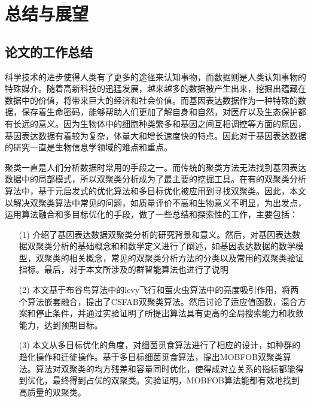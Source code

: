 \chapter{总结与展望}
\section{论文的工作总结}
科学技术的进步使得人类有了更多的途径来认知事物，而数据则是人类认知事物的特殊媒介。随着高新科技的迅猛发展，越来越多的数据被产生出来，挖掘出蕴藏在数据中的价值，将带来巨大的经济和社会价值。而基因表达数据作为一种特殊的数据，保存着生命密码，能够帮助人们更加了解自身和自然，对医疗以及生态保护都有长远的意义。因为生物体中的细胞种类繁多和基因之间互相调控等方面的原因，基因表达数据有着较为复杂，体量大和增长速度快的特点。因此对于基因表达数据的研究一直是生物信息学领域的难点和重点。

聚类一直是人们分析数据时常用的手段之一。而传统的聚类方法无法找到基因表达数据中的局部模式，所以双聚类分析成为了最主要的挖掘工具。在有的双聚类分析算法中，基于元启发式的优化算法和多目标优化被应用到寻找双聚类。因此，本文以解决双聚类算法中常见的问题，如质量评价不高和生物意义不明显，为出发点，运用算法融合和多目标优化的手段，做了一些总结和探索性的工作，主要包括：
\begin{itemize}
    \item[(1)]{介绍了基因表达数据双聚类分析的研究背景和意义。然后，对基因表达数据双聚类分析的基础概念和和数学定义进行了阐述，如基因表达数据的数学模型，双聚类的相关概念，常见的双聚类分析方法的分类以及常用的双聚类验证指标。最后，对于本文所涉及的群智能算法也进行了说明}  

    \item[(2)]{本文基于布谷鸟算法中的levy飞行和萤火虫算法中的亮度吸引作用，将两个算法嵌套融合，提出了CSFAB双聚类算法。然后讨论了适应值函数，混合方案和停止条件，并通过实验证明了所提出算法具有更高的全局搜索能力和收敛能力，达到预期目标。}

    \item[(3)]{本文从多目标优化的角度，对细菌觅食算法进行了相应的设计，如种群的趋化操作和迁徙操作。基于多目标细菌觅食算法，提出MOBFOB双聚类算法。算法对双聚类的均方残差和容量同时优化，使得成对立关系的指标都能得到优化，最终得到占优的双聚类。实验证明，MOBFOB算法能都有效地找到高质量的双聚类。}
    
\end{itemize}
